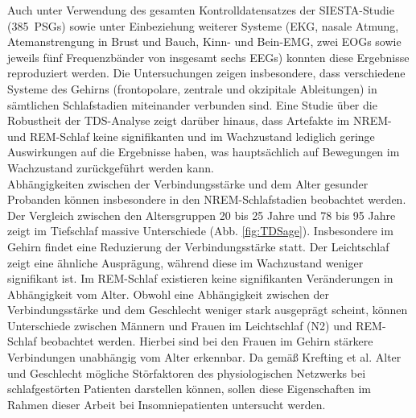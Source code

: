 Auch unter Verwendung des gesamten Kontrolldatensatzes der SIESTA-Studie (385~\acs{PSG}s) sowie unter Einbeziehung weiterer Systeme (\acs{EKG}, nasale Atmung, Atemanstrengung in Brust und Bauch, Kinn- und Bein-\acs{EMG}, zwei \acs{EOG}s sowie jeweils fünf Frequenzbänder von insgesamt sechs \acs{EEG}s) konnten diese Ergebnisse reproduziert werden. Die Untersuchungen zeigen insbesondere, dass verschiedene Systeme des Gehirns (frontopolare, zentrale und okzipitale Ableitungen) in sämtlichen Schlafstadien miteinander verbunden sind. Eine Studie über die Robustheit der \acs{TDS}-Analyse zeigt darüber hinaus, dass Artefakte im \acs{NREM}- und \acs{REM}-Schlaf keine signifikanten und im Wachzustand lediglich geringe Auswirkungen auf die Ergebnisse haben, was hauptsächlich auf Bewegungen im Wachzustand zurückgeführt werden kann. \parencite{bartsch_network_2015, breuer_netzwerktopologie_2016}\\

Abhängigkeiten zwischen der Verbindungsstärke und dem Alter gesunder Probanden können insbesondere in den \acs{NREM}-Schlafstadien beobachtet werden. Der Vergleich zwischen den Altersgruppen 20 bis 25 Jahre und 78 bis 95 Jahre zeigt im Tiefschlaf massive Unterschiede (Abb. \ref{fig:TDSage}). Insbesondere im Gehirn findet eine Reduzierung der Verbindungsstärke statt. Der Leichtschlaf zeigt eine ähnliche Ausprägung, während diese im Wachzustand weniger signifikant ist. Im \acs{REM}-Schlaf existieren keine signifikanten Veränderungen in Abhängigkeit vom Alter. Obwohl eine Abhängigkeit zwischen der Verbindungsstärke und dem Geschlecht weniger stark ausgeprägt scheint, können Unterschiede zwischen Männern und Frauen im Leichtschlaf (N2) und \acs{REM}-Schlaf beobachtet werden. Hierbei sind bei den Frauen im Gehirn stärkere Verbindungen unabhängig vom Alter erkennbar. Da gemäß Krefting et al. Alter und Geschlecht mögliche Störfaktoren des physiologischen Netzwerks bei schlafgestörten Patienten darstellen können, sollen diese Eigenschaften im Rahmen dieser Arbeit bei Insomniepatienten untersucht werden. \parencite{krefting_altersabhangigkeit_2016, krefting_age_2017}\\

